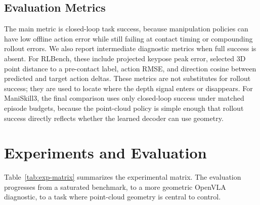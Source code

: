\documentclass[conference]{IEEEtran}
\begin{document}
\subsection{Evaluation Metrics}

The main metric is closed-loop task success, because manipulation policies can have low offline action error while still failing at contact timing or compounding rollout errors. We also report intermediate diagnostic metrics when full success is absent. For RLBench, these include projected keypose peak error, selected 3D point distance to a pre-contact label, action RMSE, and direction cosine between predicted and target action deltas. These metrics are not substitutes for rollout success; they are used to locate where the depth signal enters or disappears. For ManiSkill3, the final comparison uses only closed-loop success under matched episode budgets, because the point-cloud policy is simple enough that rollout success directly reflects whether the learned decoder can use geometry.

\section{Experiments and Evaluation}

Table~\ref{tab:exp-matrix} summarizes the experimental matrix. The evaluation progresses from a saturated benchmark, to a more geometric OpenVLA diagnostic, to a task where point-cloud geometry is central to control.

\begin{table}[t]
\centering
\caption{Experimental matrix. Each stage answers a different question.}
\label{tab:exp-matrix}
\end{table}
\end{document}
